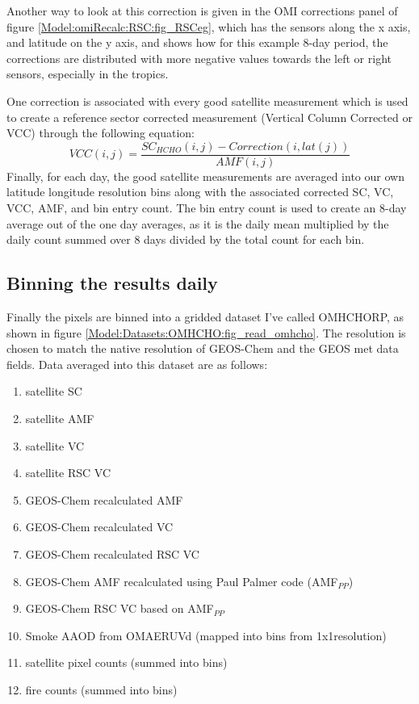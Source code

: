    Another way to look at this correction is given in the OMI corrections panel of figure \ref{Model:omiRecalc:RSC:fig_RSCeg}, which has the sensors along the x axis, and latitude on the y axis, and shows how for this example 8-day period, the corrections are distributed with more negative values towards the left or right sensors, especially in the tropics.
    
    One correction is associated with every good satellite measurement which is used to create a reference sector corrected measurement (Vertical Column Corrected or VCC) through the following equation:
    \begin{equation}
    VCC(i,j) = \frac{SC_{HCHO}(i,j) - Correction(i,lat(j))}{AMF(i,j)}
    \end{equation}
    Finally, for each day, the good satellite measurements are averaged into our own latitude longitude resolution bins along with the associated corrected SC, VC, VCC, AMF, and bin entry count.
    The bin entry count is used to create an 8-day average out of the one day averages, as it is the daily mean multiplied by the daily count summed over 8 days divided by the total count for each bin.
  
  \subsection{Binning the results daily}
    
    Finally the pixels are binned into a gridded dataset I've called OMHCHORP, as shown in figure \ref{Model:Datasets:OMHCHO:fig_read_omhcho}.
    The resolution is chosen to match the native resolution of GEOS-Chem and the GEOS met data fields.
    Data averaged into this dataset are as follows:
    \begin{enumerate}
      \item satellite SC %
      \item satellite AMF %
      \item satellite VC %
      \item satellite RSC VC %
      \item GEOS-Chem recalculated AMF %
      \item GEOS-Chem recalculated VC %
      \item GEOS-Chem recalculated RSC VC %
      \item GEOS-Chem AMF recalculated using Paul Palmer code (AMF$_{PP}$)
      \item GEOS-Chem RSC VC based on AMF$_{PP}$
      \item Smoke AAOD from OMAERUVd (mapped into bins from 1x1\degr resolution)
      \item satellite pixel counts (summed into bins)
      \item fire counts (summed into bins)
    \end{enumerate}
    
